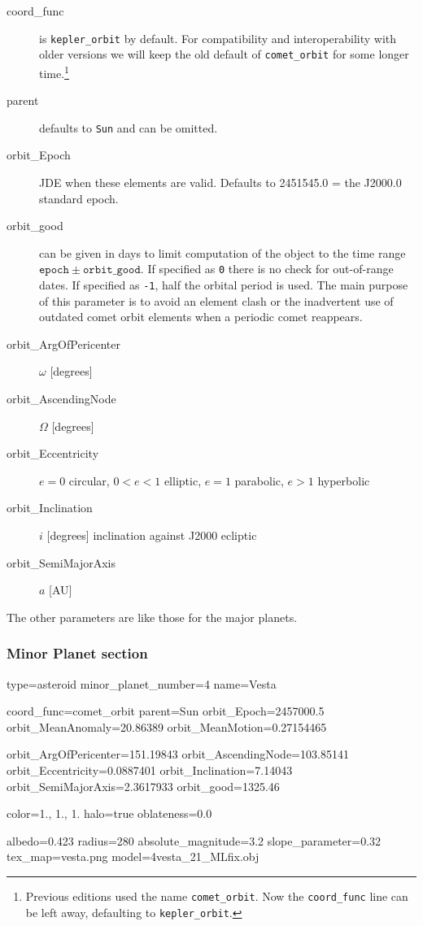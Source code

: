 \begin{description}
\item[coord\_func] is \texttt{kepler\_orbit} by
  default. For compatibility and interoperability
  with older versions we will keep the old default of
  \texttt{comet\_orbit} for some longer time.\footnote{Previous
    editions used the name \texttt{comet\_orbit}. Now the
    \texttt{coord\_func} line can be left away, defaulting to
    \texttt{kepler\_orbit}.}
\item[parent] defaults to \texttt{Sun} and can be omitted.

\item[orbit\_Epoch] JDE when these elements are valid. Defaults to
  2451545.0 = the J2000.0 standard epoch.

\item[orbit\_good] can be given in days to limit computation of the
  object to the time range
  $\mathtt{epoch}\pm\mathtt{orbit\_good}$. If
  specified as \texttt{0} there is no check for out-of-range dates. If
  specified as \texttt{-1}, half the orbital period is used. The main
  purpose of this parameter is to avoid an element clash or the
  inadvertent use of outdated comet orbit elements when a periodic
  comet reappears.

\item[orbit\_ArgOfPericenter] $\omega$ [degrees]
\item[orbit\_AscendingNode] $\Omega$  [degrees]
\item[orbit\_Eccentricity] $e=0$ circular, $0<e<1$ elliptic, $e=1$ parabolic, $e>1$ hyperbolic
\item[orbit\_Inclination] $i$ [degrees] inclination against J2000 ecliptic
\item[orbit\_SemiMajorAxis] $a$ [AU]
\end{description}
The other parameters are like those for the major planets. 

\subsubsection{Minor Planet section}
\label{sec:ssystem.ini:MinorPlanet}

\begin{configfile}
[4vesta]
type=asteroid  
minor_planet_number=4
name=Vesta

coord_func=comet_orbit
parent=Sun
orbit_Epoch=2457000.5
orbit_MeanAnomaly=20.86389
orbit_MeanMotion=0.27154465

orbit_ArgOfPericenter=151.19843
orbit_AscendingNode=103.85141
orbit_Eccentricity=0.0887401
orbit_Inclination=7.14043
orbit_SemiMajorAxis=2.3617933
orbit_good=1325.46

color=1., 1., 1.
halo=true
oblateness=0.0

albedo=0.423
radius=280
absolute_magnitude=3.2
slope_parameter=0.32
tex_map=vesta.png
model=4vesta_21_MLfix.obj
\end{configfile}

